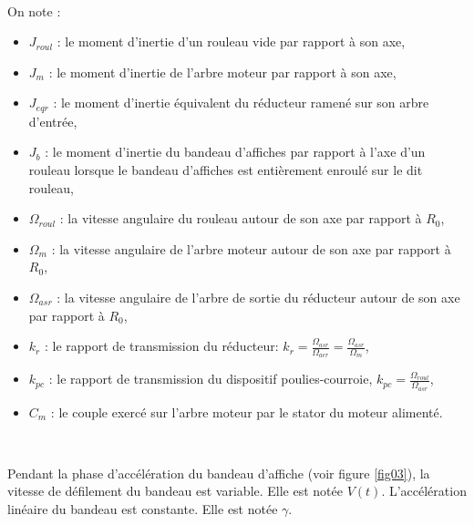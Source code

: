 ~\

On note :
\begin{itemize}
 \item $J_{roul}$ : le moment d'inertie d'un rouleau vide par rapport à son axe,
 \item $J_m$ : le moment d'inertie de l'arbre moteur par rapport à son axe,
 \item $J_{eqr}$ : le moment d'inertie équivalent du réducteur ramené sur son arbre d'entrée,
 \item $J_b$ : le moment d'inertie du bandeau d'affiches par rapport à l'axe d'un rouleau lorsque le bandeau d'affiches est entièrement enroulé sur le dit rouleau,
 \item $\Omega_{roul}$ : la vitesse angulaire du rouleau autour de son axe par rapport à $R_0$,
 \item $\Omega_m$ : la vitesse angulaire de l'arbre moteur autour de son axe par rapport à $R_0$,
 \item $\Omega_{asr}$ : la vitesse angulaire de l'arbre de sortie du réducteur autour de son axe par rapport à $R_0$,
 \item $k_r$ : le rapport de transmission du réducteur:
 $k_r=\frac{\Omega_{asr}}{\Omega_{aer}}=\frac{\Omega_{asr}}{\Omega_m}$,
 \item $k_{pc}$ : le rapport de transmission du dispositif poulies-courroie,
$k_{pc}=\frac{\Omega_{roul}}{\Omega_{asr}}$,
 \item $C_m$ : le couple exercé sur l'arbre moteur par le stator du moteur alimenté.
\end{itemize}


~\

Pendant la phase d'accélération du bandeau d'affiche (voir figure \ref{fig03}), la vitesse de défilement du bandeau est variable. Elle est notée $V(t)$. L'accélération linéaire du bandeau est constante. Elle est notée $\gamma$.


%

